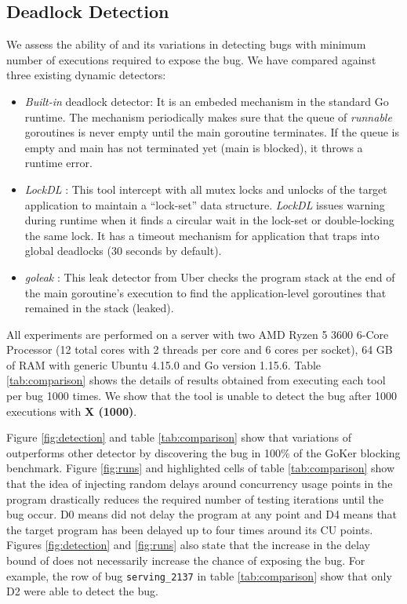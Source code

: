 \subsection{Deadlock Detection}
\label{sec:dl_evaluation}
We assess the ability of \goat and its variations in detecting bugs with minimum number of executions required to expose the bug.
%
We have compared \goat against three existing dynamic detectors:
\begin{itemize}
  \item \textit{Built-in} deadlock detector: It is an embeded mechanism in the standard Go runtime. The mechanism periodically makes sure that the queue of \textit{runnable} goroutines is never empty until the main goroutine terminates. If the queue is empty and main has not terminated yet (\ie main is blocked), it throws a runtime error.
  \item \textit{LockDL} \cite{lockdl}: This tool intercept with all mutex locks and unlocks of the target application to maintain a ``lock-set'' data structure. \textit{LockDL} issues warning during runtime when it finds a circular wait in the lock-set or double-locking the same lock. It has a timeout mechanism for application that traps into global deadlocks (30 seconds by default).
  \item \textit{goleak} \cite{goleak}: This leak detector from Uber checks the program stack at the end of the main goroutine's execution to find the application-level goroutines that remained in the stack (\ie leaked).
\end{itemize}

All experiments are performed on a server with two AMD Ryzen 5 3600 6-Core Processor (12 total cores with 2 threads per core and 6 cores per socket), 64 GB of RAM with generic Ubuntu 4.15.0 and Go version 1.15.6.
%
Table \ref{tab:comparison} shows the details of results obtained from executing each tool per bug 1000 times.
%
We show that the tool is unable to detect the bug after 1000 executions with \textbf{X (1000)}.
%

%
Figure \ref{fig:detection} and table \ref{tab:comparison} show that variations of \goat outperforms other detector by discovering the bug in 100\% of the GoKer blocking benchmark.
%
Figure \ref{fig:runs} and highlighted cells of table \ref{tab:comparison} show that the idea of injecting random delays around concurrency usage points in the program drastically reduces the required number of testing iterations until the bug occur.
%
D0 means \goat did not delay the program at any point and D4 means that the target program has been delayed up to four times around its CU points.
%
Figures \ref{fig:detection} and \ref{fig:runs} also state that the increase in the delay bound of \goat does not necessarily increase the chance of exposing the bug.
%
For example, the row of bug \texttt{serving\_2137} in table \ref{tab:comparison} show that only \goat D2 were able to detect the bug.


